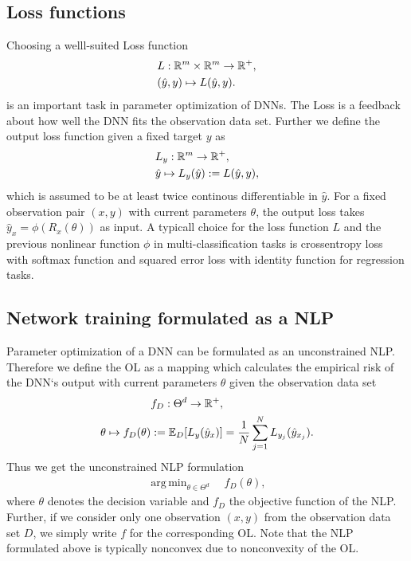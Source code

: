 \documentclass[conference]{IEEEtran}
\DeclareMathOperator*{\argmin}{arg\,min}
\begin{document}
	\subsection{Loss functions}
	\noindent
	Choosing a welll-suited Loss function
	\begin{align}
	&L:\mathbb{R}^{m}\times \mathbb{R}^{m}\rightarrow \mathbb{R}^{+}, \notag\\
	&(\hat{y}, y)\mapsto L(\hat{y}, y).
	\end{align}
	is an important task in parameter optimization of DNNs. The Loss is a feedback about how well the DNN fits the observation data set. Further we define the output loss function given a fixed target $y$ as
	\begin{align}
	&L_{y}:\mathbb{R}^{m}\rightarrow \mathbb{R}^{+}, \notag\\
	&\hat{y}\mapsto L_{y}(\hat{y}) := L(\hat{y}, y),
	\end{align}
	which is assumed to be at least twice continous differentiable in $\hat{y}$. For a fixed observation pair $(x, y)$ with current parameters $\theta$, the output loss takes $\hat{y}_{x} = \phi(R_{x}(\theta))$ as input. A typicall choice for the loss function $L$ and the previous nonlinear function $\phi$ in multi-classification tasks is crossentropy loss with softmax function and squared error loss with identity function for regression tasks.



	\subsection{Network training formulated as a NLP}
	\noindent
	Parameter optimization of a DNN can be formulated as an unconstrained NLP. Therefore we define the OL as a mapping which calculates the empirical risk of the DNN`s output with current parameters $\theta$ given the observation data set
	\begin{align}
	&f_{D}:\Theta^{d}\rightarrow\mathbb{R}^{+}, \notag\\
	\theta\mapsto f_{D}(\theta) &:= \mathbb{E}_{D}[L_{y}(\hat{y}_{x})] =  \frac{1}{N}\sum_{j = 1}^{N}L_{y_{j}}(\hat{y}_{x_{j}}).
	\end{align}
	Thus we get the unconstrained NLP formulation
	\begin{align}
	\argmin_{\theta\in\Theta^{d}}\quad f_{D}(\theta),
	\end{align}
	where $\theta$ denotes the decision variable and $f_{D}$ the objective function of the NLP.
	Further, if we consider only one observation $(x, y)$ from the observation data set $D$, we simply write  $f$ for the corresponding OL. Note that the NLP formulated above is typically nonconvex due to nonconvexity of the OL.
\end{document}
